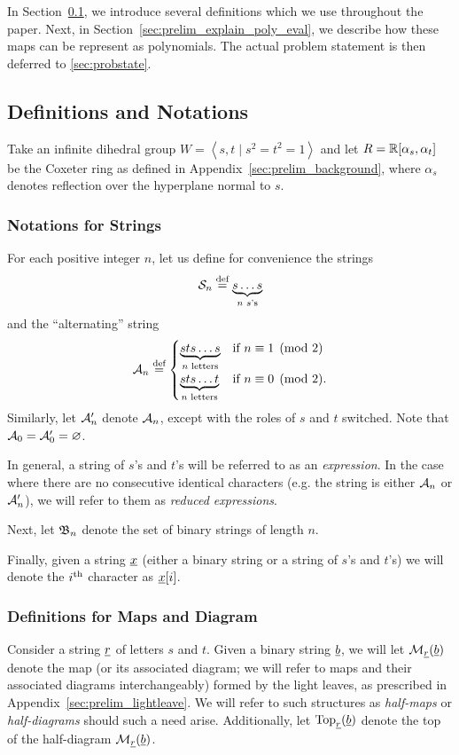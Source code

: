 In Section~\ref{sec:prelim_def_notation}, we introduce several definitions which we use throughout the paper.  Next, in Section~\ref{sec:prelim_explain_poly_eval}, we describe how these maps can be represent as polynomials.  The actual problem statement is then deferred to \ref{sec:probstate}.
\subsection{Definitions and Notations}
\label{sec:prelim_def_notation}
Take an infinite dihedral group $W=\left<s,t\mid s^2=t^2=1\right>$ and let $R = \RR[\alpha_s, \alpha_t]$ be the Coxeter ring as defined in Appendix~\ref{sec:prelim_background}, where $\alpha_s$ denotes reflection over the hyperplane normal to $s$.  
\subsubsection{Notations for Strings}
For each positive integer $n$, let us define for convenience the strings
\[ \SS_n \defeq \underbrace{s \dots s}_{\text{$n$ $s$'s}} \] 
and the ``alternating'' string
\[
	\AA_n \defeq
	\begin{cases}
		\underbrace{sts\dots s}_{\text{$n$ letters}} & \text{if } n \equiv 1 \pmod{2} \\
		\underbrace{sts\dots t}_{\text{$n$ letters}} & \text{if } n \equiv 0 \pmod{2}. 
	\end{cases}
\]
Similarly, let $\AA_n'$ denote $\AA_n$, except with the roles of $s$ and $t$ switched.  Note that $\AA_0 = \AA_0' = \varnothing$.

In general, a string of $s$'s and $t$'s will be referred to as an \emph{expression}.  In the case where there are no consecutive identical characters (e.g. the string is either $\AA_n$ or $\AA_n'$), we will refer to them as \emph{reduced expressions}.

Next, let $\BB_n$ denote the set of binary strings of length $n$.

Finally, given a string $\ul x$ (either a binary string or a string of $s$'s and $t$'s) we will denote the $i\th$ character as $\ul x[i]$.

\subsubsection{Definitions for Maps and Diagram}
Consider a string $\ul r$ of letters $s$ and $t$.  Given a binary string $\ul b$, we will let $\MM_{\ul r}(\ul b)$ denote the map (or its associated diagram; we will refer to maps and their associated diagrams interchangeably) formed by the light leaves, as prescribed in Appendix~\ref{sec:prelim_lightleave}.  We will refer to such structures as \emph{half-maps} or \emph{half-diagrams} should such a need arise.  Additionally, let $\Top_{\ul r}(\ul b)$ denote the top of the half-diagram $\MM_{\ul r}(\ul b)$.


